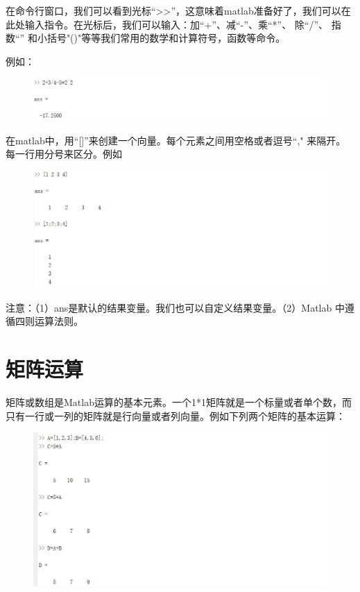 \documentclass[cn,10pt,math=newtx,citestyle=gb7714-2015,bibstyle=gb7714-2015]{elegantbook}
\begin{document}
{{\begin{figure}[htbp!]
	\end{figure}
	
	在命令行窗口，我们可以看到光标“>>”，这意味着matlab准备好了，我们可以在此处输入指令。在光标后，我们可以输入：加“+”、减“-”、乘“*”、 除“/”、 指数“” 和小括号"()"等等我们常用的数学和计算符号，函数等命令。
	
	例如：
	\begin{figure}[htbp!]
		\centering
		\includegraphics[width=0.8\linewidth]{FIG/calculate.jpg}
		
	\end{figure}
	
	在matlab中，用“[]”来创建一个向量。每个元素之间用空格或者逗号“," 来隔开。每一行用分号来区分。例如
	\begin{figure}[htbp!]
		\centering
		\includegraphics[width=0.8\linewidth]{FIG/vector.jpg}
		
	\end{figure}
	
	注意：（1）ans是默认的结果变量。我们也可以自定义结果变量。（2）Matlab 中遵循四则运算法则。
	
	\section{矩阵运算}
	
	矩阵或数组是Matlab运算的基本元素。一个1*1矩阵就是一个标量或者单个数，而只有一行或一列的矩阵就是行向量或者列向量。例如下列两个矩阵的基本运算：
	\begin{figure}[htbp!]
		\centering
		\includegraphics[width=0.8\linewidth]{FIG/matrixcalcu.jpg}
		

\end{figure}}}
\end{document}
